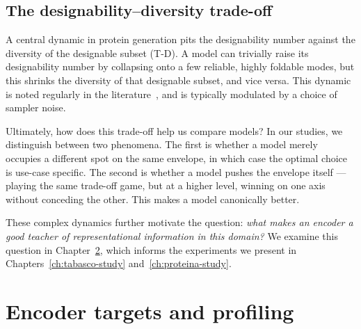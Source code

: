 \documentclass[12pt,a4paper,twoside]{report}
\begin{document}
\section{The designability--diversity trade-off}
\label{sec:protein-tradeoffs}

A central dynamic in protein generation pits the designability number against the diversity of the designable subset (T-D). A model can trivially raise its designability number by collapsing onto a few reliable, highly foldable modes, but this shrinks the diversity of that designable subset, and vice versa. This dynamic is noted regularly in the literature~\cite{Proteina}, and is typically modulated by a choice of sampler noise.

Ultimately, how does this trade-off help us compare models? In our studies, we distinguish between two phenomena. The first is whether a model merely occupies a different spot on the same envelope, in which case the optimal choice is use-case specific. The second is whether a model pushes the envelope itself --- playing the same trade-off game, but at a higher level, winning on one axis without conceding the other. This makes a model canonically better.

These complex dynamics further motivate the question: \emph{what makes an encoder a good teacher of representational information in this domain?} We examine this question in Chapter~\ref{ch:profiling}, which informs the experiments we present in Chapters~\ref{ch:tabasco-study} and~\ref{ch:proteina-study}.

\chapter{Encoder targets and profiling}
\label{ch:profiling}
\end{document}
